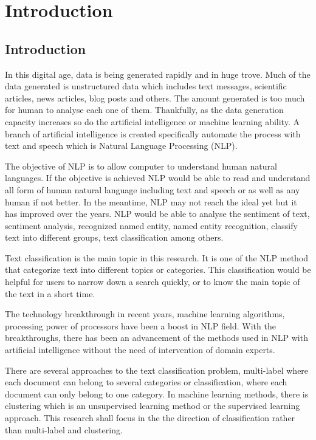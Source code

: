 \chapter{Introduction}
\section{Introduction}
In this digital age, data is being generated rapidly and in huge trove. Much of the data generated is unstructured data which includes text messages, scientific articles, news articles, blog posts and others. \cite{bigData} The amount generated is too much for human to analyse each one of them. Thankfully, as the data generation capacity increases so do the artificial intelligence or machine learning ability. A branch of artificial intelligence is created specifically automate the process with text and speech which is Natural Language Processing (NLP).

The objective of NLP is to allow computer to understand human natural languages. If the objective is achieved NLP would be able to read and understand all form of human natural language including text  and speech or as well as any human if not better. In the meantime, NLP may not reach the ideal yet but it has improved over the years. NLP would be able to analyse the sentiment of text, sentiment analysis, recognized named entity, named entity recognition, classify text into different groups, text classification among others.

Text classification is the main topic in this research. It is one of the NLP method that categorize text into different topics or categories. This classification would be helpful for users to narrow down a search quickly, or to know the main topic of the text in a short time.

The technology breakthrough in recent years, machine learning algorithms, processing power of processors have been a boost in NLP field. With the breakthroughs, there has been an advancement of the methods used in NLP with artificial intelligence without the need of intervention of domain experts.

There are several approaches to the text classification problem, multi-label where each document can belong to several categories or classification, where each document can only belong to one category. In machine learning methods, there is clustering which is an unsupervised learning method or the supervised learning approach. This research shall focus in the the direction of classification rather than multi-label and clustering.

